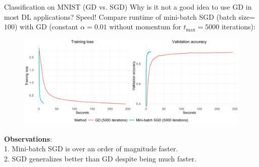 \documentclass[11pt,compress,t,notes=noshow, xcolor=table]{beamer}
\begin{document}
\begin{vbframe}{Classification on MNIST (GD vs. SGD)}
\vspace{-0.2cm}
Why is it not a good idea to use GD in most DL applications? Speed! Compare runtime of mini-batch SGD (batch size=$100$) with GD (constant $\alpha=0.01$ without momentum for $t_{\text{max}}=5000$ iterations):
\begin{figure}
            \includegraphics[width=1.0\textwidth]{slides/04-multivariate-first-order/figure_man/simu_mnist/SGD_GD_compar.pdf} \\
\end{figure} 
\textbf{Observations}:\\ 1. Mini-batch SGD is over an order of magnitude faster.\\
2. SGD generalizes better than GD despite being much faster. \\
\end{vbframe}
\end{document}
